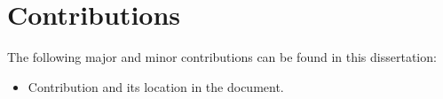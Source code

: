 \section{Contributions}
\label{sec:intro:contributions}

The following major and minor contributions can be found in this dissertation:
\begin{itemize}
    \item Contribution and its location in the document.    
\end{itemize}
